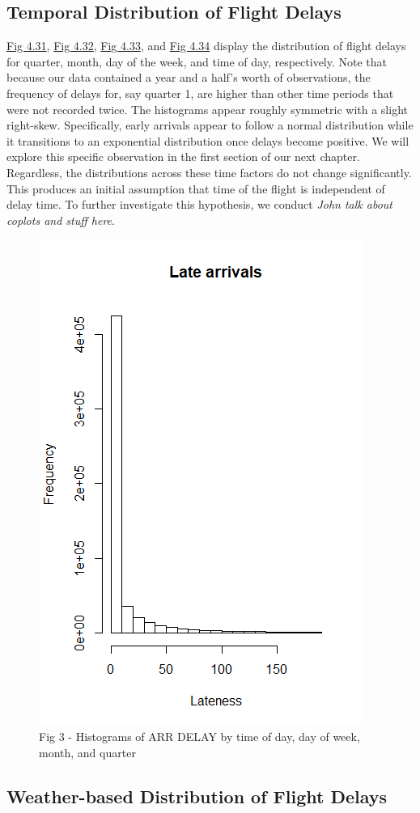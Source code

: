 \documentclass[12pt, a4paper]{book}
\newcommand\tab[1][1cm]{\hspace*{#1}}
\begin{document}
		\subsection{Temporal Distribution of Flight Delays}
		
			\tab \underline{Fig 4.31}, \underline{Fig 4.32}, \underline{Fig 4.33}, and \underline{Fig 4.34} display the distribution of flight delays for quarter, month, day of the week, and time of day, respectively. Note that because our data contained a year and a half’s worth of observations, the frequency of delays for, say quarter 1, are higher than other time periods that were not recorded twice. The histograms appear roughly symmetric with a slight right-skew. Specifically, early arrivals appear to follow a normal distribution while it transitions to an exponential distribution once delays become positive. We will explore this specific observation in the first section of our next chapter. Regardless, the distributions across these time factors do not change significantly. This produces an initial assumption that time of the flight is independent of delay time. To further investigate this hypothesis, we conduct \textit{John talk about coplots and stuff here}. \\
			\begin{figure}
			\centering
	 		\includegraphics[width = .45 \textwidth]{../figures/LateArrivalsHistogram}
	 		\caption{Fig 3 - Histograms of ARR DELAY by time of day, day of week, month, and quarter}
	 		\end{figure}
	 		
		\subsection{Weather-based Distribution of Flight Delays}
		
\end{document}
